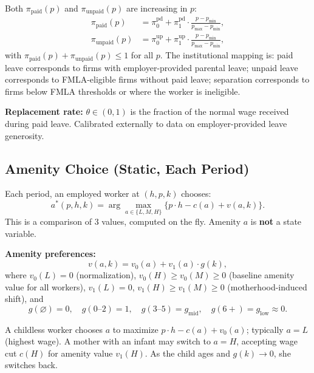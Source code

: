 \documentclass[11pt]{article}
\begin{document}
\noindent Both $\pi_{\text{paid}}(p)$ and $\pi_{\text{unpaid}}(p)$ are increasing in $p$:
\begin{align}
  \pi_{\text{paid}}(p) &= \pi^{\text{pd}}_0 + \pi^{\text{pd}}_1 \cdot \frac{p - p_{\min}}{p_{\max} - p_{\min}}, \label{eq:pi_paid}\\[4pt]
  \pi_{\text{unpaid}}(p) &= \pi^{\text{up}}_0 + \pi^{\text{up}}_1 \cdot \frac{p - p_{\min}}{p_{\max} - p_{\min}}, \label{eq:pi_unpaid}
\end{align}
with $\pi_{\text{paid}}(p) + \pi_{\text{unpaid}}(p) \leq 1$ for all $p$. The institutional mapping is: paid leave corresponds to firms with employer-provided parental leave; unpaid leave corresponds to FMLA-eligible firms without paid leave; separation corresponds to firms below FMLA thresholds or where the worker is ineligible.

\medskip\noindent\textbf{Replacement rate:} $\theta \in (0,1)$ is the fraction of the normal wage received during paid leave. Calibrated externally to data on employer-provided leave generosity.

\subsection{Amenity Choice (Static, Each Period)}

Each period, an employed worker at $(h, p, k)$ chooses:
\begin{equation}\label{eq:amenity_choice}
  a^*(p, h, k) = \arg\max_{a \in \{L,M,H\}} \big\{ p \cdot h - c(a) + v(a, k) \big\}.
\end{equation}
This is a comparison of 3 values, computed on the fly. Amenity $a$ is \textbf{not} a state variable.

\medskip\noindent\textbf{Amenity preferences:}
\begin{equation}\label{eq:amenity_pref}
  v(a, k) = v_0(a) + v_1(a) \cdot g(k),
\end{equation}
where $v_0(L) = 0$ (normalization), $v_0(H) \geq v_0(M) \geq 0$ (baseline amenity value for all workers), $v_1(L) = 0$, $v_1(H) \geq v_1(M) \geq 0$ (motherhood-induced shift), and
\[
  g(\varnothing) = 0, \quad g(0\text{--}2) = 1, \quad g(3\text{--}5) = g_{\text{mid}}, \quad g(6+) = g_{\text{low}} \approx 0.
\]

\noindent A childless worker chooses $a$ to maximize $p \cdot h - c(a) + v_0(a)$; typically $a = L$ (highest wage). A mother with an infant may switch to $a = H$, accepting wage cut $c(H)$ for amenity value $v_1(H)$. As the child ages and $g(k) \to 0$, she switches back.
\end{document}
